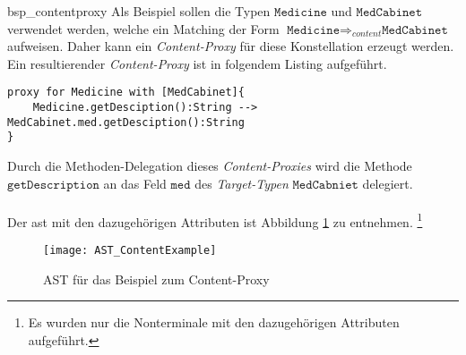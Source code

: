 \begin{example}{bsp_contentproxy}
Als Beispiel sollen die Typen $\texttt{Medicine}$ und $\texttt{MedCabinet}$ verwendet werden, welche ein Matching der Form $\texttt{Medicine} \Rightarrow_{content} \texttt{MedCabinet}$ aufweisen. Daher kann ein \emph{Content-Proxy} für diese Konstellation erzeugt werden. Ein resultierender \emph{Content-Proxy} ist in folgendem Listing aufgeführt.
\newpage
\begin{lstlisting}[style = dsl, caption = Content-Proxy für Medicine, captionpos = b]
proxy for Medicine with [MedCabinet]{
	Medicine.getDesciption():String --> MedCabinet.med.getDesciption():String
}
\end{lstlisting}
Durch die Methoden-Delegation dieses \emph{Content-Proxies} wird die Methode $\texttt{getDescription}$ an das Feld $\texttt{med}$ des \emph{Target-Typen} $\texttt{MedCabniet}$ delegiert.\\\\
Der \acrshort{ast} mit den dazugehörigen Attributen ist Abbildung \ref{fig:ASTCONTENT} zu entnehmen. \footnote{Es wurden nur die Nonterminale mit den dazugehörigen Attributen aufgeführt.}

\end{example}
\begin{figure}[h!]
\centering
\texttt{[image: AST\_ContentExample]}
\caption{AST für das Beispiel zum Content-Proxy}
\label{fig:ASTCONTENT}
\end{figure}
